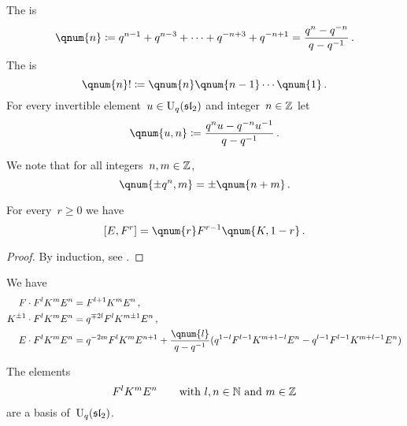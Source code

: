 \documentclass[a4paper, 11pt, oneside]{scrartcl}
\begin{document}
\begin{definition}
  The  is
  \[
    \qnum{n}
    \defined
    q^{n-1} + q^{n-3} + \dotsb + q^{-n+3} + q^{-n+1}
    =
    \frac{q^n - q^{-n}}{q - q^{-1}} \,.
  \]
  The  is
  \[
    \qnum{n}!
    \defined
    \qnum{n} \qnum{n-1} \dotsm \qnum{1} \,.
  \]
  For every invertible element~$u \in \operatorname{U}_q(\mathfrak{sl}_2)$ and integer~$n \in \mathbb{Z}$ let
  \[
    \qnum{u, n}
    \defined
    \frac{ q^n u - q^{-n} u^{-1} }{ q - q^{-1} } \,.
  \]
\end{definition}

\begin{remark}
  We note that for all integers~$n, m \in \mathbb{Z}$,
  \[
    \qnum{\pm q^n, m}
    =
    \pm \qnum{n+m} \,.
  \]
\end{remark}

\begin{lemma}
  For every~$r \geq 0$ we have
  \[
    [E, F^r]
    =
    \qnum{r} F^{r-1} \qnum{K, 1-r} \,.
  \]
\end{lemma}

\begin{proof}
  By induction, see \cite[Appendix 1.3~(5)]{jantzen_quantum}.
\end{proof}

\begin{corollary}
  \label{technical formulas}
  We have
  \begin{align*}
    F \cdot F^l K^m E^n
    &=
    F^{l+1} K^m E^n \,,
    \\
    K^{\pm 1} \cdot F^l K^m E^n
    &=
    q^{\mp 2l} F^l K^{m \pm 1} E^n \,,
    \\
    E \cdot F^l K^m E^n
    &=
    q^{-2m} F^l K^m E^{n+1}
    +
    \frac{\qnum{l}}{q - q^{-1}}
    (
      q^{1-l} F^{l-1} K^{m + 1-l} E^n
      -
      q^{l-1} F^{l-1} K^{m + l-1} E^n
    )
  \end{align*}
\end{corollary}

\begin{theorem}[PBW]
  \label{quantum pbw}
  The elements
  \[
    F^l K^m E^n
    \qquad
    \text{with~$l, n \in \mathbb{N}$ and~$m \in \mathbb{Z}$} 
  \]
  are a basis of~$\operatorname{U}_q(\mathfrak{sl}_2)$.
\end{theorem}
\end{document}
